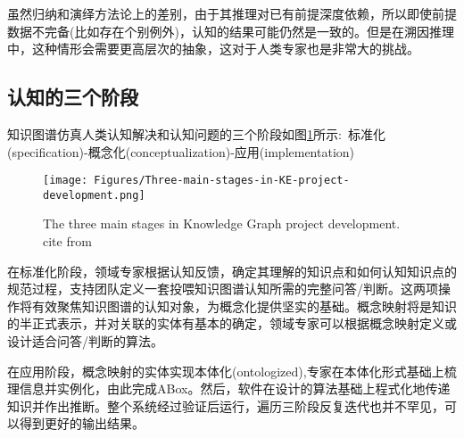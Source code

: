 虽然归纳和演绎方法论上的差别，由于其推理对已有前提深度依赖，所以即使前提数据不完备(比如存在个别例外)，认知的结果可能仍然是一致的。但是在溯因推理中，这种情形会需要更高层次的抽象，这对于人类专家也是非常大的挑战。

\subsection{认知的三个阶段}
知识图谱仿真人类认知解决和认知问题的三个阶段如图\ref{Fig:Three-main-stages-in-KE-pro-dev}所示:~标准化\textrm{(specification)}-概念化\textrm{(conceptualization)}-应用\textrm{(implementation)}
\begin{figure}[h!]
\centering
\texttt{[image: Figures/Three-main-stages-in-KE-project-development.png]}
\caption{\small\textrm{The three main stages in Knowledge Graph project development. cite from\cite{ACR56-128_2023}}}%
\label{Fig:Three-main-stages-in-KE-pro-dev}
\end{figure}
在标准化阶段，领域专家根据认知反馈，确定其理解的知识点和如何认知知识点的规范过程，支持团队定义一套投喂知识图谱认知所需的完整问答/判断。这两项操作将有效聚焦知识图谱的认知对象，为概念化提供坚实的基础。概念映射将是知识的半正式表示，并对关联的实体有基本的确定，领域专家可以根据概念映射定义或设计适合问答/判断的算法。

在应用阶段，概念映射的实体实现本体化\textrm{(ontologized)},专家在本体化形式基础上梳理信息并实例化，由此完成\textrm{ABox}。然后，软件在设计的算法基础上程式化地传递知识并作出推断。整个系统经过验证后运行，遍历三阶段反复迭代也并不罕见，可以得到更好的输出结果。

